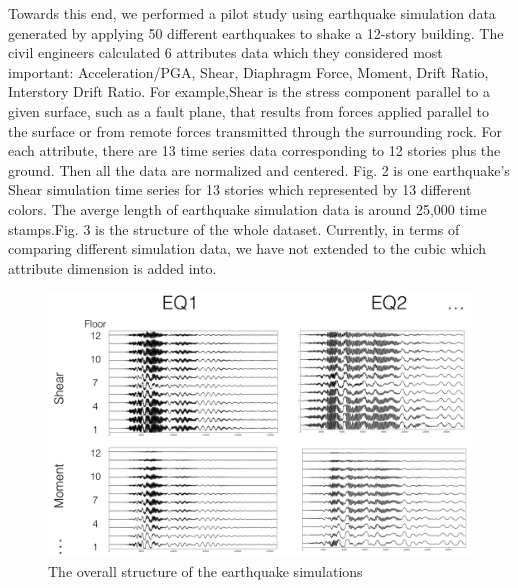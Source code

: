 Towards this end, we performed a pilot study using  earthquake simulation data generated by applying 50 different earthquakes to shake a 12-story building. The civil engineers calculated 6 attributes data which they considered most important: Acceleration/PGA, Shear, Diaphragm Force, Moment, Drift Ratio, Interstory Drift Ratio. For example,Shear is the stress component parallel to a given surface, such as a fault plane, that results from forces applied parallel to the surface or from remote forces transmitted through the surrounding rock. For each attribute, there are 13 time series data corresponding to 12 stories plus the ground. Then all the data are normalized and centered. Fig. 2 is one earthquake's Shear simulation time series for 13 stories which represented by 13 different colors.  The averge length of earthquake simulation data is around 25,000 time stamps.Fig. 3 is the structure of the whole dataset. Currently, in terms of comparing different simulation data, we have not extended to the cubic  which attribute dimension is added into.
\begin{figure}[h]
	\centering %
	\includegraphics[width=\columnwidth]{figs/structure} 
	\caption{The overall structure of the earthquake simulations}
	\label{fig:data}
\end{figure}


